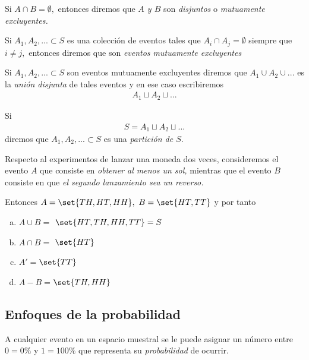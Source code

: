 {}
 Si $A\cap B= \emptyset,$ entonces diremos que \emph{$A$ y $B$} son \emph{disjuntos} o \emph{mutuamente excluyentes.} 

 \begin{defn}
  Si $A_{1},A_{2},... \subset S$ es una colección de eventos tales que $A_{i}\cap A_{j}=\emptyset$ siempre que $i\neq j,$ entonces diremos que son \emph{eventos mutuamente excluyentes}
 \end{defn}

 


 \begin{defn}
  Si $A_{1}, A_{2}, ...\subset S$ son eventos mutuamente excluyentes diremos que $A_{1} \cup A_{2} \cup ... $ es la \emph{unión disjunta} de tales eventos y en ese caso escribiremos
  \begin{align*}
A_{1}\sqcup A_{2} \sqcup ...
\end{align*}
 \end{defn}


\begin{defn}
	Si \begin{align*}
		S=A_{1}\sqcup A_{2} \sqcup ...
	\end{align*}
	diremos que $A_{1},A_{2},...\subset S$  es una \emph{partición de $S.$}
\end{defn}


 \begin{ejemplo}
  \label{exmp:1.9}
  Respecto al experimentos de lanzar una moneda dos veces, consideremos el evento $A$ que consiste en \emph{obtener al menos un sol,}  mientras que el evento $B$ consiste en que \emph{el segundo lanzamiento sea un reverso.}

  Entonces $A=\set{TH,HT,HH},$ $B=\set{HT,TT}$ y por tanto 
  \begin{enumerate}[(a)]
   \item $A\cup B =$ $\set{HT,TH,HH,TT}= S$ 
	\item $A\cap B =$ $\set{HT}$ 
	\item $A'=$$\set{TT}$
	\item $A-B=$$\set{TH,HH}$
  \end{enumerate}

 \end{ejemplo}


\subsection{Enfoques de la probabilidad}

A cualquier evento en un espacio muestral se le puede asignar un número entre $0=0\%$ y $1=100\%$ que representa su \emph{probabilidad} de ocurrir.



